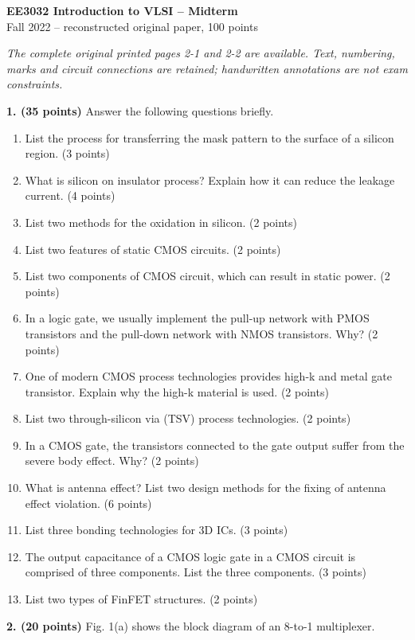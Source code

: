 \documentclass[10pt]{article}
\begin{document}
\begin{center}\large\textbf{EE3032 Introduction to VLSI -- Midterm}\\\normalsize Fall 2022 -- reconstructed original paper, 100 points\end{center}
\textit{The complete original printed pages 2-1 and 2-2 are available. Text, numbering, marks and circuit connections are retained; handwritten annotations are not exam constraints.}\par
\textbf{1. (35 points)} Answer the following questions briefly.
\begin{enumerate}[label=(\alph*),leftmargin=7mm,itemsep=3pt]
\item List the process for transferring the mask pattern to the surface of a silicon region. (3 points)
\item What is silicon on insulator process? Explain how it can reduce the leakage current. (4 points)
\item List two methods for the oxidation in silicon. (2 points)
\item List two features of static CMOS circuits. (2 points)
\item List two components of CMOS circuit, which can result in static power. (2 points)
\item In a logic gate, we usually implement the pull-up network with PMOS transistors and the pull-down network with NMOS transistors. Why? (2 points)
\item One of modern CMOS process technologies provides high-k and metal gate transistor. Explain why the high-k material is used. (2 points)
\item List two through-silicon via (TSV) process technologies. (2 points)
\item In a CMOS gate, the transistors connected to the gate output suffer from the severe body effect. Why? (2 points)
\item What is antenna effect? List two design methods for the fixing of antenna effect violation. (6 points)
\item List three bonding technologies for 3D ICs. (3 points)
\item The output capacitance of a CMOS logic gate in a CMOS circuit is comprised of three components. List the three components. (3 points)
\item List two types of FinFET structures. (2 points)
\end{enumerate}\newpage\textbf{2. (20 points)} Fig. 1(a) shows the block diagram of an 8-to-1 multiplexer.
\end{document}
